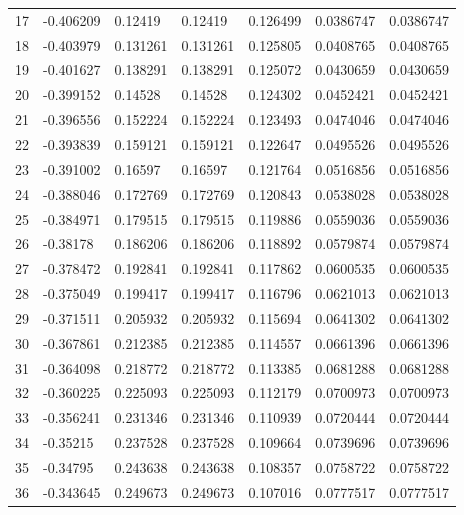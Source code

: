 \begin{longtable}{l|lll|lll}
  17 & -0.406209    & 0.12419     & 0.12419     &  0.126499    & 0.0386747   & 0.0386747   \\
  18 & -0.403979    & 0.131261    & 0.131261    &  0.125805    & 0.0408765   & 0.0408765   \\
  19 & -0.401627    & 0.138291    & 0.138291    &  0.125072    & 0.0430659   & 0.0430659   \\
  20 & -0.399152    & 0.14528     & 0.14528     &  0.124302    & 0.0452421   & 0.0452421   \\
  21 & -0.396556    & 0.152224    & 0.152224    &  0.123493    & 0.0474046   & 0.0474046   \\
  22 & -0.393839    & 0.159121    & 0.159121    &  0.122647    & 0.0495526   & 0.0495526   \\
  23 & -0.391002    & 0.16597     & 0.16597     &  0.121764    & 0.0516856   & 0.0516856   \\
  24 & -0.388046    & 0.172769    & 0.172769    &  0.120843    & 0.0538028   & 0.0538028   \\
  25 & -0.384971    & 0.179515    & 0.179515    &  0.119886    & 0.0559036   & 0.0559036   \\
  26 & -0.38178     & 0.186206    & 0.186206    &  0.118892    & 0.0579874   & 0.0579874   \\
  27 & -0.378472    & 0.192841    & 0.192841    &  0.117862    & 0.0600535   & 0.0600535   \\
  28 & -0.375049    & 0.199417    & 0.199417    &  0.116796    & 0.0621013   & 0.0621013   \\
  29 & -0.371511    & 0.205932    & 0.205932    &  0.115694    & 0.0641302   & 0.0641302   \\
  30 & -0.367861    & 0.212385    & 0.212385    &  0.114557    & 0.0661396   & 0.0661396   \\
  31 & -0.364098    & 0.218772    & 0.218772    &  0.113385    & 0.0681288   & 0.0681288   \\
  32 & -0.360225    & 0.225093    & 0.225093    &  0.112179    & 0.0700973   & 0.0700973   \\
  33 & -0.356241    & 0.231346    & 0.231346    &  0.110939    & 0.0720444   & 0.0720444   \\
  34 & -0.35215     & 0.237528    & 0.237528    &  0.109664    & 0.0739696   & 0.0739696   \\
  35 & -0.34795     & 0.243638    & 0.243638    &  0.108357    & 0.0758722   & 0.0758722   \\
  36 & -0.343645    & 0.249673    & 0.249673    &  0.107016    & 0.0777517   & 0.0777517   \\

\end{longtable}

